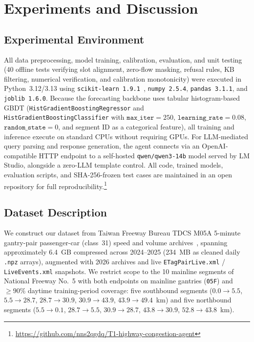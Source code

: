 \documentclass[conference]{IEEEtran}
\begin{document}
\section{Experiments and Discussion}

\subsection{Experimental Environment}
All data preprocessing, model training, calibration, evaluation, and unit testing (40 offline tests verifying slot alignment, zero-flow masking, refusal rules, KB filtering, numerical verification, and calibration monotonicity) were executed in Python~3.12/3.13 using \texttt{scikit-learn~1.9.1}~\cite{pedregosa2011sklearn}, \texttt{numpy~2.5.4}, \texttt{pandas~3.1.1}, and \texttt{joblib~1.6.0}. Because the forecasting backbone uses tabular histogram-based GBDT (\texttt{HistGradientBoostingRegressor} and \texttt{HistGradientBoostingClassifier} with $\texttt{max\_iter}=250$, $\texttt{learning\_rate}=0.08$, $\texttt{random\_state}=0$, and segment ID as a categorical feature), all training and inference execute on standard CPUs without requiring GPUs. For LLM-mediated query parsing and response generation, the agent connects via an OpenAI-compatible HTTP endpoint to a self-hosted \texttt{qwen/qwen3-14b} model served by LM Studio, alongside a zero-LLM template control. All code, trained models, evaluation scripts, and SHA-256-frozen test cases are maintained in an open repository for full reproducibility.\footnote{\url{https://github.com/nns2qgdq/T1-highway-congestion-agent}}

\subsection{Dataset Description}
We construct our dataset from Taiwan Freeway Bureau TDCS M05A 5-minute gantry-pair passenger-car (class~31) speed and volume archives~\cite{tdcs_m05a}, spanning approximately 6.4~GB compressed across 2024--2025 (234~MB as cleaned daily \texttt{.npz} arrays), augmented with 2026 archives and live \texttt{ETagPairLive.xml} / \texttt{LiveEvents.xml} snapshots. We restrict scope to the 10 mainline segments of National Freeway No.~5 with both endpoints on mainline gantries (\texttt{05F}) and $\ge 90\%$ daytime training-period coverage: five southbound segments ($0.0\to 5.5$, $5.5\to 28.7$, $28.7\to 30.9$, $30.9\to 43.9$, $43.9\to 49.4$~km) and five northbound segments ($5.5\to 0.1$, $28.7\to 5.5$, $30.9\to 28.7$, $43.8\to 30.9$, $52.8\to 43.8$~km).
\end{document}
